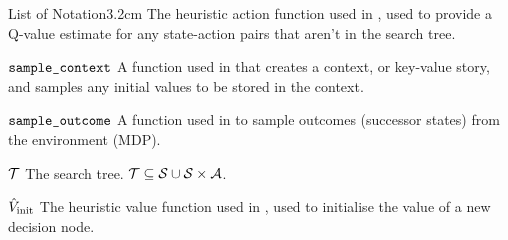 \begin{mclistof}{List of Notation}{3.2cm}
        The heuristic action function used in \thtspp, used to provide a Q-value estimate for any state-action pairs that aren't in the search tree.
    \item[${\textnormal{\texttt{sample\_context}}}$]
        A function used in \thtspp\ewe that creates a context, or key-value story, and samples any initial values to be stored in the context.
    \item[${\textnormal{\texttt{sample\_outcome}}}$]
        A function used in \thtspp\ewe to sample outcomes (successor states) from the environment (MDP).
    \item[$\mathcal{T}$] 
        The \thtspp\ewe search tree. $\mathcal{T}\subseteq \mathcal{S} \cup \mathcal{S}\times\mathcal{A}$. 
    \item[${\hat{V}_{\textnormal{init}}}$]
        The heuristic value function used in \thtspp, used to initialise the value of a new decision node. 

\end{mclistof}

